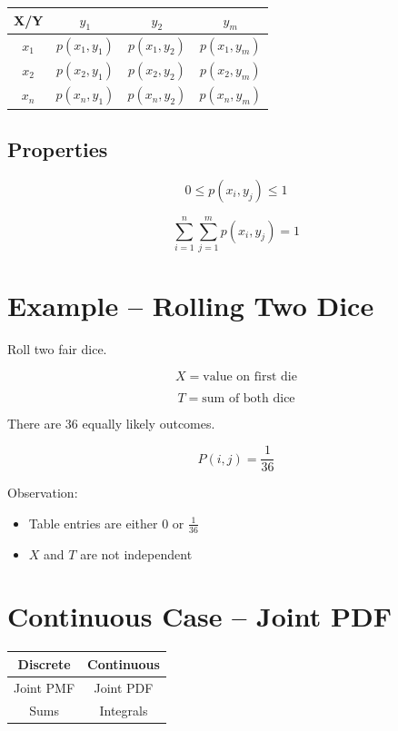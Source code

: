 \documentclass{article}
\begin{document}
\begin{center}
\begin{tabular}{c|ccc}
X/Y & $y_1$ & $y_2$ & $y_m$ \\ \hline
$x_1$ & $p(x_1,y_1)$ & $p(x_1,y_2)$ & $p(x_1,y_m)$ \\
$x_2$ & $p(x_2,y_1)$ & $p(x_2,y_2)$ & $p(x_2,y_m)$ \\
$x_n$ & $p(x_n,y_1)$ & $p(x_n,y_2)$ & $p(x_n,y_m)$ \\
\end{tabular}
\end{center}

\subsection{Properties}

\[
0 \le p(x_i,y_j) \le 1
\]

\[
\sum_{i=1}^{n} \sum_{j=1}^{m} p(x_i,y_j) = 1
\]

\section{Example -- Rolling Two Dice}

Roll two fair dice.

\[
X = \text{value on first die}
\]

\[
T = \text{sum of both dice}
\]

There are 36 equally likely outcomes.

\[
P(i,j) = \frac{1}{36}
\]

Observation:

\begin{itemize}
\item Table entries are either $0$ or $\frac{1}{36}$
\item $X$ and $T$ are not independent
\end{itemize}

\section{Continuous Case -- Joint PDF}

\begin{center}
\begin{tabular}{c|c}
Discrete & Continuous \\
\hline
Joint PMF & Joint PDF \\
Sums & Integrals \\
\end{tabular}
\end{center}
\end{document}
